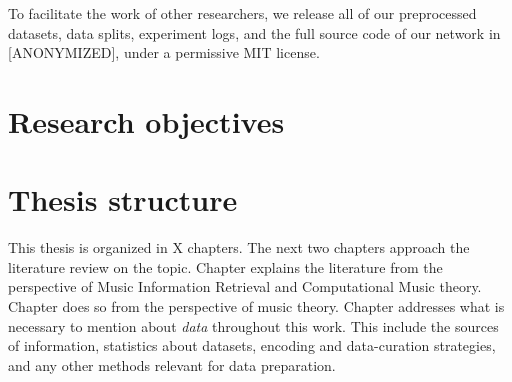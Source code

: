 To facilitate the work of other researchers, we release all of our preprocessed datasets, data splits, experiment logs, and the full source code of our network in [ANONYMIZED], under a permissive MIT license.


\section{Research objectives}


\section{Thesis structure}
This thesis is organized in X chapters. 
The next two chapters approach the literature review on the topic.
Chapter  explains the literature from the perspective of Music Information Retrieval and Computational Music theory.
Chapter  does so from the perspective of music theory.
Chapter  addresses what is necessary to mention about \emph{data} throughout this work.
This include the sources of information, statistics about datasets, encoding and data-curation strategies, and any other methods relevant for data preparation.





